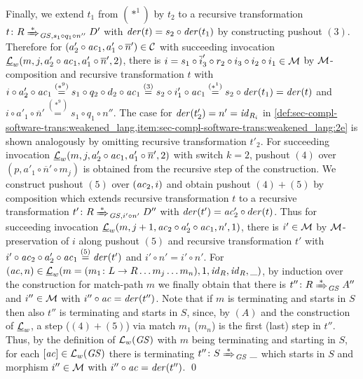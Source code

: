 \begin{enumerate}
\begin{center}
	\end{center} 
  Finally, we extend $t_1$ from $(*^1)$ by $t_2$ to a recursive transformation $t\colon R \Trans{*}_{\GS,s_1 \circ q_1 \circ n''} D'$ with $\mathit{der}(t)=s_2 \circ \mathit{der}(t_1)$ by constructing pushout $(3)$.\thispagestyle{plain}
  Therefore for $(a'_2 \circ \mathit{ac}_1,a'_1 \circ \overline{n}') \in \mathcal{C}$ with succeeding invocation $\underline{\mathcal{L}}_w(m,j,a'_2 \circ \mathit{ac}_1,a'_1 \circ \overline{n}',2)$, there is $i=s_1 \circ \overline{i}'_3 \circ r_2 \circ i_3 \circ i_2 \circ i_1 \in {\cal M}$ by ${\cal M}$-composition and recursive transformation $t$ with $i \circ a'_2 \circ \mathit{ac}_1 \stackrel{(*^9)}{=} s_1 \circ q_2 \circ d_2 \circ \mathit{ac}_1 \stackrel{(3)}{=} s_2 \circ i'_1 \circ \mathit{ac}_1 \stackrel{(*^1)}{=} s_2 \circ \mathit{der}(t_1)=\mathit{der}(t)$ and $i \circ a'_1 \circ \overline{n}' \stackrel{(*^9)}{=}s_1 \circ q_1 \circ n''$.
  The case for $\mathit{der}(t'_2)=n'=\mathit{id}_{R_i}$ in \cref{def:sec-compl-software-trans:weakened_lang,item:sec-compl-software-trans:weakened_lang:2e} is shown analogously by omitting recursive transformation $t'_2$.
  For succeeding invocation $\underline{\mathcal{L}}_w(m,j,a'_2 \circ \mathit{ac}_1,a'_1 \circ \overline{n}',2)$ with switch $k=2$, pushout $(4)$ over $(p,a'_1 \circ \overline{n}' \circ m_j)$ is obtained from the recursive step of the construction.
  We construct pushout $(5)$ over $(\mathit{ac}_2,i)$ and obtain pushout $(4)+(5)$ by composition which extends recursive transformation $t$ to a recursive transformation $t'\colon R \Trans{*}_{\GS,i' \circ n'} D''$ with $\mathit{der}(t')=\mathit{ac}'_2 \circ der(t)$.
  Thus for succeeding invocation $\underline{\mathcal{L}}_w(m,j+1,\mathit{ac}_2 \circ a'_2 \circ \mathit{ac}_1,n',1)$, there is $i' \in {\cal M}$ by ${\cal M}$-preservation of $i$ along pushout $(5)$ and recursive transformation $t'$ with $i' \circ \mathit{ac}_2 \circ a'_2 \circ \mathit{ac}_1 \stackrel{(5)}{=} \mathit{der}(t')$ and $i' \circ n' = i'\circ n'$.
  For $(\mathit{ac},n) \in \underline{\mathcal{L}}_w(m=(m_1\colon L \to R\ldots m_j\ldots m_n),1,\mathit{id}_R,\mathit{id}_R,\_)$, by induction over the construction for match-path $m$ we finally obtain that there is $t''\colon R \Trans{*}_\GS A''$ and $i'' \in {\cal M}$ with $i'' \circ \mathit{ac}=\mathit{der}(t'')$.
  Note that if $m$ is terminating and starts in $S$ then also $t''$ is terminating and starts in $S$, since, by $(A)$ and the construction of $\underline{\mathcal{L}}_w$, a step ($(4)+(5)$) via match $m_1$ ($m_n$) is the first (last) step in $t''$.
  Thus, by the definition of $\mathcal{L}_w(\mathit{GS})$ with $m$ being terminating and starting in $S$, for each $[\mathit{ac}] \in \mathcal{L}_w(\mathit{GS})$ there is terminating $t''\colon S \Trans{*}_\GS \_$ which starts in $S$ and morphism $i'' \in {\cal M}$ with $i'' \circ \mathit{ac}=\mathit{der}(t'')$.
  \qed
\end{enumerate}

